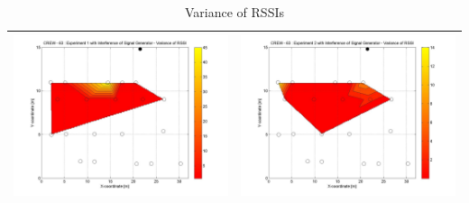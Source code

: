 \documentclass[11pt,a4paper,headinclude,footinclude,chapterprefix=on]{scrreprt}
\begin{document}
\begin{table}
	[h] \centering \caption{Variance of RSSIs} 
	\label{tb:63:Sig:variance} 
	\begin{tabular}
		{|l|l|} \hline 
		\includegraphics[width=8cm]{../../Source/plot/CREW_63/63_Sig_Ex_1_Variance.jpg} & 		\includegraphics[width=8cm]{../../Source/plot/CREW_63/63_Sig_Ex_2_Variance.jpg} \\
		\hline
	\end{tabular}
\end{table}
\pagebreak 
\end{document}
